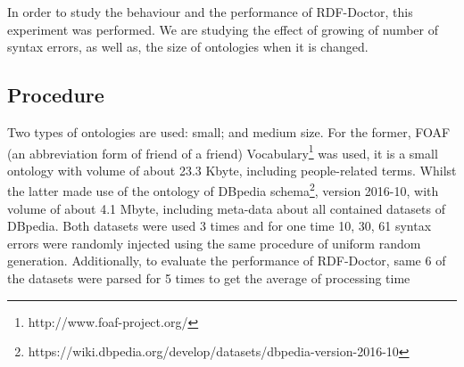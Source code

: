 In order to study the behaviour and the performance of RDF-Doctor, this experiment was performed. We are studying the effect of growing of number of syntax errors, as well as, the size of ontologies when it is changed. 


\subsection{Procedure}
Two types of ontologies are used: small; and medium size. For the former, FOAF  (an abbreviation form of friend of a friend) Vocabulary\footnote{http://www.foaf-project.org/} was used, it is a small ontology with volume of about 23.3 Kbyte, including people-related terms. Whilst the latter made use of the ontology  of DBpedia schema\footnote{https://wiki.dbpedia.org/develop/datasets/dbpedia-version-2016-10}, version 2016-10, with volume of about 4.1 Mbyte, including meta-data about all contained datasets of DBpedia. Both datasets were used 3 times and for one time 10, 30, 61 syntax errors were randomly  injected using the same procedure of uniform random generation. Additionally, to evaluate the performance of RDF-Doctor, same 6 of the datasets were parsed for 5 times to get the average of processing time  

 
